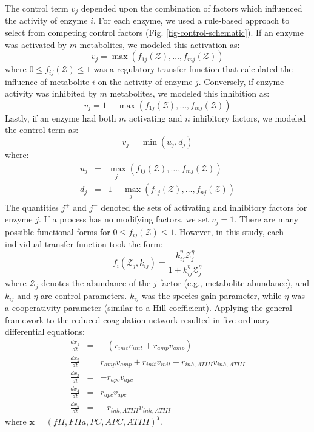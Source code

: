 \documentclass[processes,article,received,moreauthors,pdftex,12pt,a4paper]{mdpi}
\begin{document}
The control term $v_{j}$ depended upon the combination of factors which influenced the activity of enzyme $i$.
For each enzyme, we used a rule-based approach to select from competing control factors (Fig. \ref{fig-control-schematic}). 
If an enzyme was activated by $m$ metabolites, we modeled this activation as:
\begin{equation}
	v_{j} = \max\left(f_{1j}\left(\mathcal{Z}\right),\hdots,f_{mj}\left(\mathcal{Z}\right)\right)
\end{equation}where $0\leq f_{ij}\left(\mathcal{Z}\right)\leq 1$ was a regulatory transfer function that calculated the influence of metabolite $i$ on the activity of enzyme $j$. 
Conversely, if enzyme activity was inhibited by $m$ metabolites, we modeled this inhibition as:
\begin{equation}
	v_{j} = 1 - \max\left(f_{1j}\left(\mathcal{Z}\right),\hdots,f_{mj}\left(\mathcal{Z}\right)\right)
\end{equation}Lastly, if an enzyme had both $m$ activating and $n$ inhibitory factors, we modeled the control term as:
\begin{equation}
	v_{j} = \min\left(u_{j},d_{j}\right)
\end{equation}where:
\begin{eqnarray}
	u_{j} &=& \max_{j^{+}}\left(f_{1j}\left(\mathcal{Z}\right),\hdots,f_{mj}\left(\mathcal{Z}\right)\right) \\
	d_{j} &=& 1 - \max_{j^{-}}\left(f_{1j}\left(\mathcal{Z}\right),\hdots,f_{nj}\left(\mathcal{Z}\right)\right)
\end{eqnarray}
The quantities $j^{+}$ and $j^{-}$ denoted the sets of activating and inhibitory factors for enzyme $j$. 
If a process has no modifying factors, we set $v_{j} = 1$.
There are many possible functional forms for $0\leq f_{ij}\left(\mathcal{Z}\right)\leq 1$. 
However, in this study, each individual transfer function took the form:
\begin{equation}\label{eqn:control-factor}
	f_{i}\left(\mathcal{Z}_{j},k_{ij}\right) = \frac{k_{ij}^{\eta}\mathcal{Z}_{j}^{\eta}}{1 + k_{ij}^{\eta}\mathcal{Z}_{j}^{\eta}}
\end{equation}where $\mathcal{Z}_{j}$ denotes the abundance of the $j$ factor (e.g., metabolite abundance), and $k_{ij}$ and $\eta$ are control parameters. 
$k_{ij}$ was the species gain parameter, while $\eta$ was a cooperativity parameter (similar to a Hill coefficient).
Applying the general framework to the reduced coagulation network resulted in five ordinary differential equations:
\begin{eqnarray}
	\frac{dx_{1}}{dt} & =& -\left(r_{init}v_{init} + r_{amp}v_{amp}\right)\\
	\frac{dx_{2}}{dt} &=& r_{amp}v_{amp} + r_{init}v_{init} - r_{inh,ATIII}v_{inh,ATIII}\\
	\frac{dx_{3}}{dt} &=& -r_{apc}v_{apc} \\
	\frac{dx_{4}}{dt} &=& r_{apc}v_{apc} \\
	\frac{dx_{5}}{dt} & = & -r_{inh,ATIII}v_{inh,ATIII}
\end{eqnarray}where $\mathbf{x} = \left(fII,FIIa,PC,APC,ATIII\right)^{T}$. 
\end{document}
